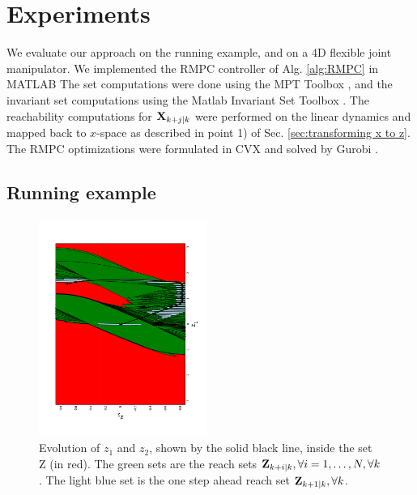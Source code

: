 \section{Experiments}
\label{sec:simulations}

We evaluate our approach on the running example, and on a 4D flexible joint manipulator.
We implemented the RMPC controller of Alg. \ref{alg:RMPC} in MATLAB
The set computations were done using the MPT Toolbox \cite{MPT3}, and the invariant set computations using the Matlab Invariant Set Toolbox \cite{IST}. 
The reachability computations for $\mathbf{X}_{k+j|k}$ were performed on the linear dynamics and mapped back to $x$-space as described in point 1) of Sec. \ref{sec:transforming x to z}. 
The RMPC optimizations were formulated in CVX \cite{cvx} and solved by Gurobi \cite{gurobi}.

\subsection{Running example}

\begin{figure}
\includegraphics[angle=270,width=0.49\textwidth]{figs/z_trajectory_new_2.pdf}
\caption{Evolution of $z_1$ and $z_2$, shown by the solid black line, inside the set Z (in red). The green sets are the reach sets $\mathbf{Z}_{k+i|k},\forall i=1,\dotsc,N, \forall k$. The light blue set is the one step ahead reach set $\mathbf{Z}_{k+1|k},\forall k$.}
\label{fig:z_new_toy}
\end{figure}



